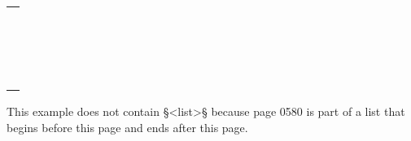 \documentclass[fontsize=11pt, paper=a4, 
DIV15,
headings=normal,
parskip=half-, 
numbers=noenddot]{scrartcl}
\makeatletter
\newenvironment{typeChineseSmall}{\begin{alltt}\footnotesize\begin{tabular}{@{}l}}{\end{tabular}\end{alltt}}
\newcommand{\chin}[1]{{\fontspec{Sun-ExtA}{#1}}}
\newcommand{\f}[1]{\bold{#1}} %
\newcommand{\z}[1]{\chin{#1}} %
\newcommand{\smlb}{\bold{\textbackslash\textbackslash}}
\makeatother
\begin{document}
\begin{example}[: page 0580]
\begin{typeChineseSmall}
\f{<p>}\z{易經疑問}\f{(}\z{十二卷}\f{\smlb}\z{冊}\f{)}\z{　}\f{(}\z{八}\f{\smlb}\z{姚舜牧}\f{)}\z{　易筌}\f{(}\z{六}\f{<003>\smlb}\z{六冊}\f{)}\z{　}\f{(}\z{焦竑}\f{)</p>} \\
\f{<p>}\z{像象管見}\f{(}\z{六卷}\f{\smlb}\z{四冊}\f{)}\z{　}\f{(}\z{錢一本}\f{)}\z{　易知齊易說}\f{(}\z{一}\f{<003>\smlb}\z{一冊}\f{)}\z{　}\f{(}\z{李登}\f{)</p>} \\
\f{<p>}\z{易像管}\f{<009>(}\z{十五卷}\f{\smlb}\z{冊}\f{)}\z{　}\f{(}\z{八}\f{\smlb}\z{黃正憲}\f{)}\z{　周易宗義}\f{(}\z{十二}\f{<003>\smlb}\z{十二冊}\f{)}\z{　}\f{(}\z{程汝}\f{\smlb}\z{繼}\f{)</p>} \\
\f{<p>}\z{周易繹}\f{<008>(}\z{七卷}\f{)}\z{　}\f{(}\z{四冊}\f{\smlb}\z{又更定易繹}\f{<008>)}\z{　}\f{(}\z{俱吳烔}\f{\smlb}\z{卷冊同}\f{)</p>} \\
\f{<p>}\z{周易畧義}\f{(}\z{乾坤至}\f{<010>}\z{八卦}\f{)}\z{　}\f{(}\z{一}\f{<003>)}\z{　}\f{(}\z{一冊}\f{)}\z{　}\f{(}\z{劉一焜}\f{)</p>} \\
\f{<p>}\z{易}\f{<012>(}\z{五}\f{<003>\smlb}\z{五冊}\f{)}\z{　}\f{(}\z{喻安性}\f{)}\z{　易會}\f{(}\z{八卷}\f{\smlb}\z{四冊}\f{)}\z{　}\f{(}\z{鄒德溥}\f{)</p>} \\
\f{<pb d>} \\
\f{<p>}\z{易筏}\f{(}\z{六卷}\f{\smlb}\z{六冊}\f{)}\z{　}\f{(}\z{張燧輯}\f{)}\z{　易}\f{<013>(}\z{三}\f{<003>\smlb}\z{一冊}\f{)}\z{　}\f{(}\z{陳履祥}\f{)</p>} \\
\f{<p><014>}\z{窩易因指}\f{(}\z{八卷}\f{\smlb}\z{八冊}\f{)}\z{　}\f{(}\z{張汝}\f{\smlb}\z{霖}\f{)}\z{　易略}\f{(}\z{三卷}\f{\smlb}\z{一冊}\f{)}\z{　}\f{(}\z{陸夢龍}\f{)</p>} \\
\f{<p>}\z{鄭孔肩易臆}\f{(}\z{三}\f{<003>\smlb}\z{一冊}\f{)}\z{　}\f{(}\z{鄭圭}\f{)}\z{　讀書心印}\f{(}\z{七}\f{<003>\smlb}\z{五冊}\f{)}\z{　}\f{(}\z{朱篁}\f{)</p>} \\
\f{<p>}\z{居易齊讀易雜言}\f{(}\z{一卷}\f{\smlb}\z{冊}\f{)}\z{　}\f{(}\z{一}\f{\smlb}\z{朱篁}\f{)</p>} \\
\f{<p>}\z{易賸}\f{(}\z{六}\f{<003>)}\z{　}\f{(}\z{三冊}\f{)}\z{　}\f{(}\z{王應遴}\f{)</p>} \\
\f{<p>}\z{易鮮俚語}\f{(}\z{一卷}\f{)}\z{　}\f{(}\z{林子分內集}\f{)}\z{　}\f{(}\z{林兆恩}\f{\smlb}\z{巳上俱詳說}\f{)</p>} \\
\f{<p>}\z{卦名鮮}\f{(}\z{一卷}\f{)}\z{　}\f{(}\z{王安石}\f{\smlb}\z{載本集}\f{)}\z{　易象論}\f{)}\z{一卷}\f{)}\z{　}\f{)}\z{王安石}\f{\smlb}\z{載本集}\f{)</p>} \\
\f{<p>}\z{易}\f{<015>}\z{子問}\f{(}\z{三}\f{<003>)}\z{　}\f{(}\z{歐陽修}\f{\smlb}\z{載本集}\f{)}\z{　張橫渠易說}\f{(}\z{三}\f{\smlb<003>)}\z{　}\f{(}\z{張載}\f{\smlb}\z{載本集}\f{)</p>} \\
\f{<p>}\z{李泰伯易論}\f{(}\z{一}\f{\smlb<003>)}\z{　}\f{(}\z{載本集}\f{)}\z{　讀易私言}\f{(}\z{一卷}\f{)}\z{　}\f{(}\z{許衡}\f{\smlb}\z{載本集}\f{)</p>} \\
\f{</toc>} \\
\end{typeChineseSmall}

\end{example}

\vspace{-3mm}
\begin{note}
This example does not contain §<list>§ because page 0580 is part of a list that begins before this page and ends after this page.
\end{note}
\end{document}
